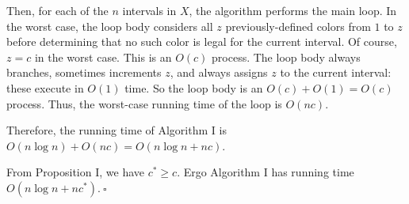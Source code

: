\begin{enumerate}
\begin{solution}
Then, for each of the $n$ intervals in $X$, the algorithm performs the main loop. In the worst case, the loop body considers all $z$ previously-defined colors from $1$ to $z$ before determining that no such color is legal for the current interval. Of course, $z=c$ in the worst case. This is an $O(c)$ process. The loop body always branches, sometimes increments $z$, and always assigns $z$ to the current interval: these execute in $O(1)$ time. So the loop body is an $O(c)+O(1)=O(c)$ process. Thus, the worst-case running time of the loop is $O(nc)$.

Therefore, the running time of Algorithm I is $O(n\log n)+O(nc)=O(n\log n+nc)$.

From Proposition I, we have $c^*\geq c$. Ergo Algorithm I has running time $O(n\log n+nc^*).~\square$
\end{solution}
\end{enumerate}